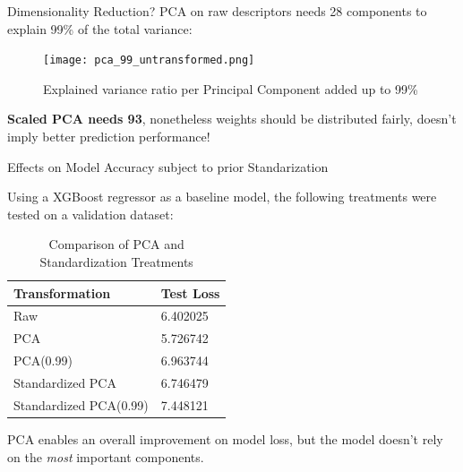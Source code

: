 \documentclass{beamer}
\begin{document}
        \begin{frame}{Dimensionality Reduction?}
            PCA on raw descriptors needs 28 components to explain 99\% of the total variance:
            \begin{figure}
                \centering
                \texttt{[image: pca\_99\_untransformed.png]}
                \caption{Explained variance ratio per Principal Component added up to 99\%}
            \end{figure}

            \textbf{Scaled PCA needs 93}, nonetheless weights should be distributed fairly, doesn't imply better prediction performance!
        \end{frame}

        \begin{frame}{Effects on Model Accuracy subject to prior Standarization}

            Using a XGBoost regressor as a baseline model, the following treatments were tested on a validation dataset:
            \begin{table}[!htbp]
                \begin{tabular}{ll}
                    \hline
                    Transformation & Test Loss \\
                    \hline
                    Raw &  6.402025 \\
                    PCA &  5.726742 \\
                    PCA(0.99) &  6.963744 \\
                    Standardized PCA &  6.746479 \\
                    Standardized PCA(0.99) &  7.448121 \\
                    \hline
                \end{tabular}
                \caption{Comparison of PCA and Standardization Treatments}
            \end{table}

            PCA enables an overall improvement on model loss, but the model doesn't rely on the \textit{most} important components.
        \end{frame}
\end{document}
